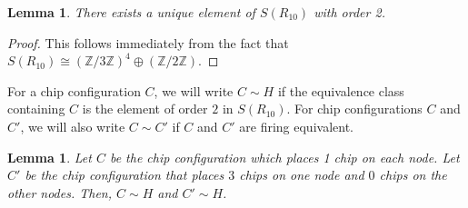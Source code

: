 \documentclass[12p]{amsart}
\numberwithin{equation}{section}
\theoremstyle{plain}
\newtheorem{lemma}[thm]{Lemma}
\theoremstyle{definition}
\newcommand{\Z}{\mathbb {Z}}
\begin{document}
\begin{lemma}
    There exists a unique element of $S(R_{10})$ with order 2. 
\end{lemma}
\begin{proof}
    This follows immediately from the fact that $S(R_{10}) \cong (\Z/3\Z)^4 \oplus (\Z/2\Z)$. 
\end{proof}

For a chip configuration $C$, we will write $C \sim H$ if the equivalence class containing $C$ is the element of order $2$ in $S(R_{10})$. For chip configurations $C$ and $C'$, we will also write $C \sim C'$ if $C$ and $C'$ are firing equivalent. 

\begin{lemma}\label{lem:half_vals} 
    Let $C$ be the chip configuration which places 1 chip on each node. Let $C'$ be the chip configuration that places $3$ chips on one node and $0$ chips on the other nodes. Then, $C \sim H$ and $C' \sim H$. 
\end{lemma}
\end{document}
